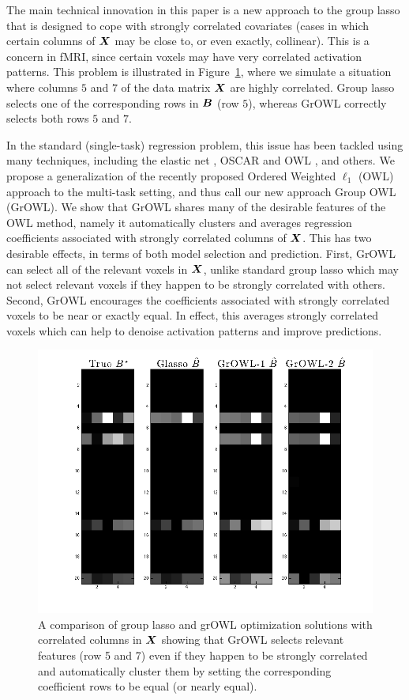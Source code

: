 The main technical innovation in this paper is a new approach to the group lasso that is
designed to cope with strongly correlated covariates (\ie cases in which certain columns
of $\boldsymbol{X}$ may be close to, or even exactly, collinear). This is a concern in fMRI, since
certain voxels may have very correlated activation patterns. This problem is illustrated
in Figure~\ref{Fig:sim}, where we simulate a situation where columns $5$ and $7$ of the
data matrix $\boldsymbol{X}$ are highly correlated. Group lasso selects one of the corresponding rows
in $\boldsymbol{B}$ (row $5$), whereas GrOWL correctly selects both rows $5$ and $7$.

In the standard (single-task) regression problem, this issue has been tackled using many
techniques, including the elastic net \cite{EN}, OSCAR \cite{oscar} and OWL \cite{owl},
and others. We propose a generalization of the recently proposed Ordered Weighted
$\ell_1$ (OWL) approach to the multi-task setting, and thus call our new approach Group
OWL (GrOWL). We show that GrOWL shares many of the desirable features of the OWL method,
namely it automatically clusters and averages regression coefficients associated with
strongly correlated columns of $\boldsymbol{X}$. This has two desirable effects, in terms of both
model selection and prediction. First, GrOWL can select all of the relevant voxels in
$\boldsymbol{X}$, unlike standard group lasso which may not select relevant voxels if they happen to
be strongly correlated with others. Second, GrOWL encourages the coefficients associated
with strongly correlated voxels to be near or exactly equal. In effect, this averages
strongly correlated voxels which can help to denoise activation patterns and improve
predictions.


\begin{figure}[!t]
    \centering
    \includegraphics[width=0.6\linewidth]{figures/sim3.png}
    \qquad
   \caption{A comparison of group lasso and grOWL optimization solutions with correlated columns in $\boldsymbol{X}$ showing that GrOWL selects relevant features (row 5 and 7) even if they happen to be strongly correlated and automatically cluster them by setting the corresponding coefficient rows to be equal (or nearly equal).}
    \label{Fig:sim}
  \end{figure}
